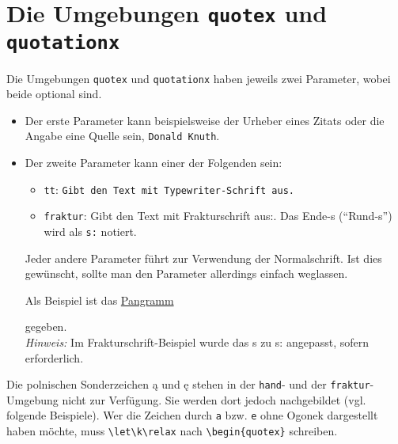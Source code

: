 
		\section{Die Umgebungen \texttt{quotex} und \texttt{quotationx}}
			\label{quotex_quotationx}

			Die Umgebungen \texttt{quotex} und \texttt{quotationx} haben jeweils zwei Parameter, wobei beide optional sind.
			\begin{itemize}
				\item Der erste Parameter kann beispielsweise der Urheber eines Zitats oder die Angabe eine Quelle sein, \zb \texttt{Donald Knuth}.
				\item Der zweite Parameter kann einer der Folgenden sein:
					\begin{itemize}
						\item \texttt{tt}: {\texttt{Gibt den Text mit Typewriter-Schrift aus.}}
						\item \texttt{fraktur}: {\frakfamily Gibt den Text mit Frakturschrift aus:.} Das Ende-s ("`Rund-s"') wird als \verb|s:| notiert.
					\end{itemize}
					Jeder andere Parameter führt zur Verwendung der Normalschrift. Ist dies gewünscht, sollte man den Parameter allerdings einfach weglassen.

					\newpage
					Als Beispiel ist das \href{https://de.wikipedia.org/wiki/Pangramm\#Liste_deutscher_Pangramme}{Pangramm}
					\begin{quote}
						\pangramm
					\end{quote}
					gegeben.\\
					\emph{Hinweis:} Im Frakturschrift-Beispiel wurde das {\frakfamily s} zu {\frakfamily s:} angepasst, sofern erforderlich.
			\end{itemize}

			\begin{redbox}
				Die polnischen Sonderzeichen \k a und \k e stehen in der \texttt{hand}- und der \texttt{fraktur}-Umgebung nicht zur Verfügung. Sie werden dort jedoch nachgebildet (vgl. folgende Beispiele). Wer die Zeichen durch \texttt{a} bzw. \texttt{e} ohne Ogonek dargestellt haben möchte, muss \verb|\let\k\relax| nach \texttt{\textbackslash begin\{quotex\}} schreiben.
			\end{redbox}

